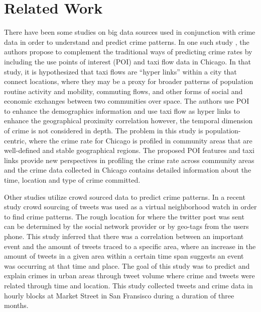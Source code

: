 \documentclass{sigkddExp}
\begin{document}

\section{Related Work}

There have been some studies on big data sources used in conjunction with crime data in order to understand and predict crime patterns. 
In one such study \cite{Wang16}, the authors propose to complement the traditional ways of predicting crime rates by including the use points of interest (POI) and taxi flow data in Chicago. 
In that study, it is hypothesized that taxi flows are ``hyper links'' within a city that connect locations, where they may be a proxy for broader patterns of population routine activity and mobility, commuting flows, and other forms of social and economic exchanges between two communities over space. The authors use POI to enhance the demographics information and use taxi flow as hyper links to enhance the geographical proximity correlation however, the temporal dimension of crime is not considered in depth. The problem in this study is population-centric, where the crime rate for Chicago is profiled in community areas that are well-defined and stable geographical regions. The proposed POI features and taxi links provide new perspectives in profiling the crime rate across community areas and the crime data collected in Chicago contains detailed information about the time, location and type of crime committed.

Other studies utilize crowd sourced data to predict crime patterns. In a recent study \cite{Bendler14}crowd sourcing of tweets was used as a virtual neighborhood watch in order to find crime patterns. The rough location for where the twitter post was sent can be determined by the social network provider or by geo-tags from the users phone. This study inferred that there was a correlation between an important event and the amount of tweets traced to a specific area, where an increase in the amount of tweets in a given area within a certain time span suggests an event was occurring at that time and place. The goal of this study was to predict and explain crimes in urban areas through tweet volume where crime and tweets were related through time and location. This study collected tweets and crime data in hourly blocks at Market Street in San Fransisco during a duration of three months. 
\end{document}
